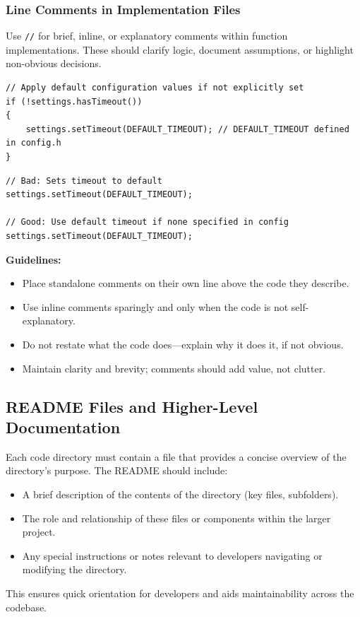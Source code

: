 \subsubsection*{Line Comments in Implementation Files}

Use \texttt{//} for brief, inline, or explanatory comments within function implementations. These should clarify logic, document assumptions, or highlight non-obvious decisions.
\begin{lstlisting}[style=cppstyle]
// Apply default configuration values if not explicitly set
if (!settings.hasTimeout()) 
{
    settings.setTimeout(DEFAULT_TIMEOUT); // DEFAULT_TIMEOUT defined in config.h
}
\end{lstlisting}
\begin{lstlisting}[style=cppstyle]
// Bad: Sets timeout to default
settings.setTimeout(DEFAULT_TIMEOUT);

// Good: Use default timeout if none specified in config
settings.setTimeout(DEFAULT_TIMEOUT);
\end{lstlisting}
\textbf{Guidelines:}
\begin{itemize}\itemsep0em
    \item Place standalone comments on their own line above the code they describe.
    \item Use inline comments sparingly and only when the code is not self-explanatory.
    \item Do not restate what the code does—explain why it does it, if not obvious.
    \item Maintain clarity and brevity; comments should add value, not clutter.
\end{itemize}



\subsection{README Files and Higher-Level Documentation}

Each code directory must contain a  file that provides a concise overview of the directory’s purpose. The README should include:
\begin{itemize}\itemsep0em
    \item A brief description of the contents of the directory (key files, subfolders).
    \item The role and relationship of these files or components within the larger project.
    \item Any special instructions or notes relevant to developers navigating or modifying the directory.
\end{itemize}
This ensures quick orientation for developers and aids maintainability across the codebase.

